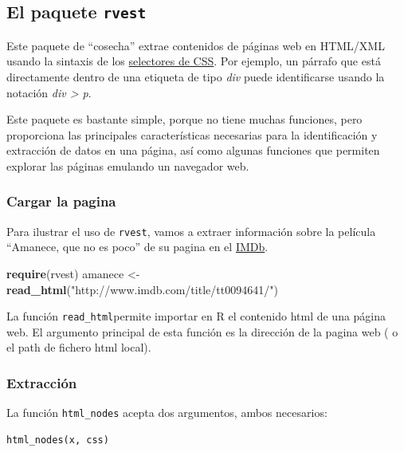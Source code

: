 \documentclass[]{article}
\newenvironment{Shaded}{\begin{snugshade}}{\end{snugshade}}
\newcommand{\KeywordTok}[1]{\textcolor[rgb]{0.13,0.29,0.53}{\textbf{#1}}}
\newcommand{\StringTok}[1]{\textcolor[rgb]{0.31,0.60,0.02}{#1}}
\newcommand{\NormalTok}[1]{#1}
\begin{document}
\subsection{\texorpdfstring{El paquete
\texttt{rvest}}{El paquete rvest}}\label{el-paquete-rvest}

Este paquete de ``cosecha'' extrae contenidos de páginas web en HTML/XML
usando la sintaxis de los
\href{https://www.w3schools.com/cssref/css_selectors.asp}{selectores de
CSS}. Por ejemplo, un párrafo que está directamente dentro de una
etiqueta de tipo \emph{div} puede identificarse usando la notación
\emph{div \textgreater{} p}.

Este paquete es bastante simple, porque no tiene muchas funciones, pero
proporciona las principales características necesarias para la
identificación y extracción de datos en una página, así como algunas
funciones que permiten explorar las páginas emulando un navegador web.

\subsubsection{Cargar la pagina}\label{cargar-la-pagina}

Para ilustrar el uso de \texttt{rvest}, vamos a extraer información
sobre la película ``Amanece, que no es poco'' de su pagina en el
\href{http://www.imdb.com/title/tt0094641/}{IMDb}.

\begin{Shaded}
\begin{Highlighting}[]
\KeywordTok{require}\NormalTok{(rvest)}
\NormalTok{amanece <-}\StringTok{ }\KeywordTok{read_html}\NormalTok{(}\StringTok{"http://www.imdb.com/title/tt0094641/"}\NormalTok{)}
\end{Highlighting}
\end{Shaded}

La función \texttt{read\_html}permite importar en R el contenido html de
una página web. El argumento principal de esta función es la dirección
de la pagina web ( o el path de fichero html local).

\subsubsection{Extracción}\label{extraccion}

La función \texttt{html\_nodes} acepta dos argumentos, ambos necesarios:

\begin{verbatim}
html_nodes(x, css)
\end{verbatim}
\end{document}
